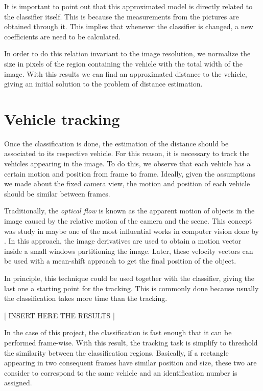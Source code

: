 It is important to point out that this approximated model is directly related to
the classifier itself. This is because the measurements from the pictures are
obtained through it. This implies that whenever the classifier is changed, a new
coefficients are need to be calculated.

In order to do this relation invariant to the image resolution, we normalize the
size in pixels of the region containing the vehicle with the total width of the
image. With this results we can find  an approximated distance to the
vehicle, giving an initial solution to the problem of distance estimation.


\section{Vehicle tracking} %
\label{sec:vehicle-tracking}

Once the classification is done, the estimation of the distance should be
associated to its respective vehicle. For this reason, it is necessary to track
the vehicles appearing in the image. To do this, we observe that each vehicle has 
a certain motion and position from frame to frame. Ideally, given the
assumptions we made about the fixed camera view, the motion and position of each
vehicle should be similar between frames.

Traditionally, the \textit{optical flow} is known as the apparent motion of
objects in the image caused by the relative motion of the camera and the scene.
This concept was study in maybe one of the most influential works in computer 
vision done by \cite{lucas-kanade}. In this approach, the image derivatives are
used to obtain a motion vector inside a small windows partitioning the image. 
Later, these velocity vectors can be used with a mean-shift approach to get 
the final position of the object.

In principle, this technique could be used together with the classifier, giving
the last one a starting point for the tracking. This is commonly done because
usually the classification takes more time than the tracking. 

[ INSERT HERE THE RESULTS ]

In the case of
this project, the classification is fast enough that it can be performed
frame-wise. With this result, the tracking task is simplify to
threshold the similarity between the classification regions. Basically, if a 
rectangle appearing in two consequent frames have similar position and size, these
two are consider to correspond to the same vehicle and an identification number
is assigned. 

